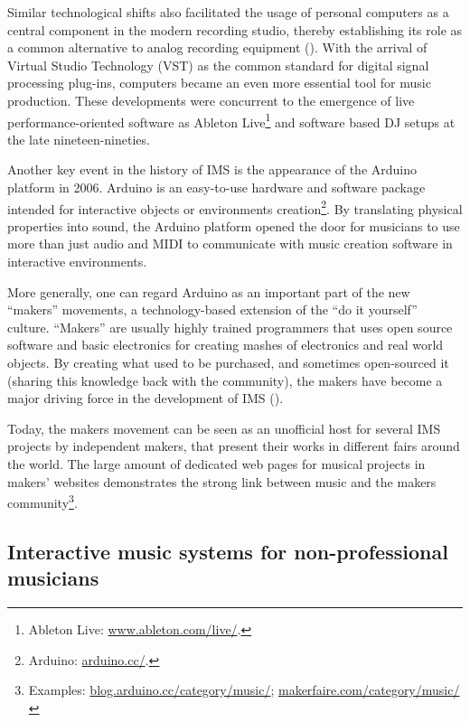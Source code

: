 \documentclass[a4paper,11pt]{article}
\begin{document}
Similar technological shifts also facilitated the usage of personal computers as a central component in the modern recording studio, thereby establishing its role as a common alternative to analog recording equipment (\cite{leider:04}).
With the arrival of Virtual Studio Technology (VST) as the common standard for digital signal processing plug-ins, computers became an even more essential tool for music production.
These developments were concurrent to the emergence of live performance-oriented software as Ableton Live\footnote{Ableton Live: \href{http://www.ableton.com/en/live/}{www.ableton.com/live/}.} and software based DJ setups at the late nineteen-nineties.

Another key event in the history of IMS is the appearance of the Arduino platform in 2006.
Arduino is an easy-to-use hardware and software package intended for interactive objects or environments creation\footnote{Arduino: \href{http://arduino.cc/}{arduino.cc/}.}.
By translating physical properties into sound, the Arduino platform opened the door for musicians to use more than just audio and MIDI to communicate with music creation software in interactive environments.

More generally, one can regard Arduino as an important part of the new ``makers'' movements, a technology-based extension of the ``do it yourself'' culture.
``Makers'' are usually highly trained programmers that uses open source software and basic electronics for creating mashes of electronics and real world objects.
By creating what used to be purchased, and sometimes open-sourced it (sharing this knowledge back with the community), the makers have become a major driving force in the development of IMS (\cite{web:kirn12}).

Today, the makers movement can be seen as an unofficial host for several IMS projects by independent makers, that present their works in different fairs around the world.
The large amount of dedicated web pages for musical projects in makers' websites demonstrates the strong link between music and the makers community\footnote{Examples: \href{http://blog.arduino.cc/category/music/}{blog.arduino.cc/category/music/}; \href{http://makerfaire.com/category/music/}{makerfaire.com/category/music/}}.

\subsection{Interactive music systems for non-professional musicians} \label{literature:non_pro_ims}
\end{document}
